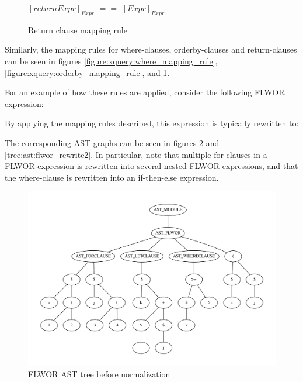 \begin{figure}[!h]
\centering
$[return Expr]_{Expr}$ \newline
$==$ \newline
$[Expr]_{Expr}$
  \caption{Return clause mapping rule}
  \label{figure:xquery:return_mapping_rule}
\end{figure}

Similarly, the mapping rules for where-clauses, orderby-clauses and
return-clauses can be seen in figures \ref{figure:xquery:where_mapping_rule},
\ref{figure:xquery:orderby_mapping_rule},
and \ref{figure:xquery:return_mapping_rule}.

For an example of how these rules are applied, consider the following FLWOR
expression:


By applying the mapping rules described,  this expression is typically
rewritten to:


The corresponding AST graphs can be seen in figures
\ref{tree:ast:flwor_rewrite1} and \ref{tree:ast:flwor_rewrite2}. In particular,
note that multiple for-clauses in a FLWOR expression is rewritten into several
nested FLWOR expressions, and that the where-clause is  rewritten into an
if-then-else expression. 

\begin{figure}[h!]
\centering
 \includegraphics[scale=0.50]{img/graphs/flwor_rewrite1}
\caption{FLWOR AST tree before normalization}
\label{tree:ast:flwor_rewrite1}
\end{figure}

